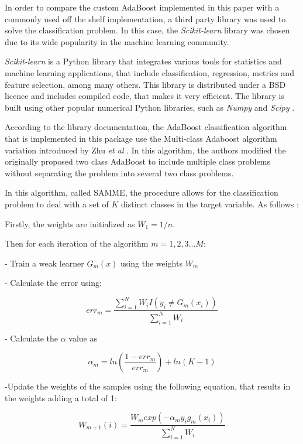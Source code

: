 \documentclass[11pt,twocolumn,letterpaper]{article}
\begin{document}
In order to compare the custom AdaBoost implemented in this paper with a commonly used off the shelf implementation, a third party library was used to solve the classification problem. In this case, the \textit{Scikit-learn} library was chosen due to its wide popularity in the machine learning community.

\textit{Scikit-learn} is a Python library that integrates various tools for statistics and machine learning applications, that include classification, regression, metrics and feature selection, among many others. This library is distributed under a BSD licence and includes compiled code, that makes it very efficient. The library is built using other popular numerical Python libraries, such as \textit{Numpy} and \textit{Scipy} \cite{Pedregosa2011}.

According to the library documentation, the AdaBoost classification algorithm that is implemented in this package use the Multi-class Adaboost algorithm variation introduced by Zhu \textit{et al} \cite{Zhu2009}. In this algorithm, the authors modified the originally proposed two class AdaBoost \cite{Freund1999} to include multiple class problems without separating the problem into several two class problems.

In this algorithm, called SAMME, the procedure allows for the classification problem to deal with a set of $K$ distinct classes in the target variable. As follows \cite{Zhu2009}:

Firstly, the weights are initialized as $W_1 = 1/n$. 

Then for each iteration of the algorithm $m = 1,2,3...M$:

- Train a weak learner $G_m(x)$ using the weights $W_m$

- Calculate the error using:

\begin{equation}
	err_m = \frac{\sum_{i=1}^{N} W_i I(y_i \neq G_m(x_i))}{\sum_{i=1}^{N} W_i} 
\end{equation}

- Calculate the $\alpha$ value as

\begin{equation}
	\alpha_m = ln(\frac{1-err_m}{err_m}) + ln(K-1)
\end{equation}

-Update the weights of the samples using the following equation, that results in the weights adding  a total of 1:

\begin{equation}
	W_{m+1} (i) = \frac{W_m exp(-\alpha_m y_i g_m(x_i))}{\sum_{i=1}^{N} W_i}
\end{equation}
\end{document}
